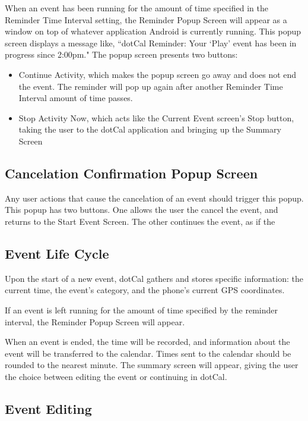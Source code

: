 \documentclass[11pt]{article}
\begin{document}
When an event has been running for the amount of time specified in the Reminder Time Interval setting, the Reminder Popup Screen will appear as a window on top of whatever application Android is currently running. This popup screen displays a message like, ``dotCal Reminder: Your `Play' event has been in progress since 2:00pm." The popup screen presents two buttons:
\begin{itemize}
	\item{{\sc Continue Activity}, which makes the popup screen go away and does not end the event. The reminder will pop up again after another Reminder Time Interval amount of time passes.}
	\item{{\sc Stop Activity Now}, which acts like the Current Event screen's Stop button, taking the user to the dotCal application and bringing up the Summary Screen}
\end{itemize}

\subsection{Cancelation Confirmation Popup Screen}

Any user actions that cause the cancelation of an event should trigger this popup. This popup has two buttons. One allows the user the cancel the event, and returns to the Start Event Screen. The other continues the event, as if the 

\subsection{Event Life Cycle}

Upon the start of a new event, dotCal gathers and stores specific information: the current time, the event's category, and the phone's current GPS coordinates. 

If an event is left running for the amount of time specified by the reminder interval, the Reminder Popup Screen will appear.

When an event is ended, the time will be recorded, and information about the event will be transferred to the calendar. Times sent to the calendar should be  rounded to the nearest minute. The summary screen will appear, giving the user the choice between editing the event or continuing in dotCal.


\subsection{Event Editing}
\end{document}
